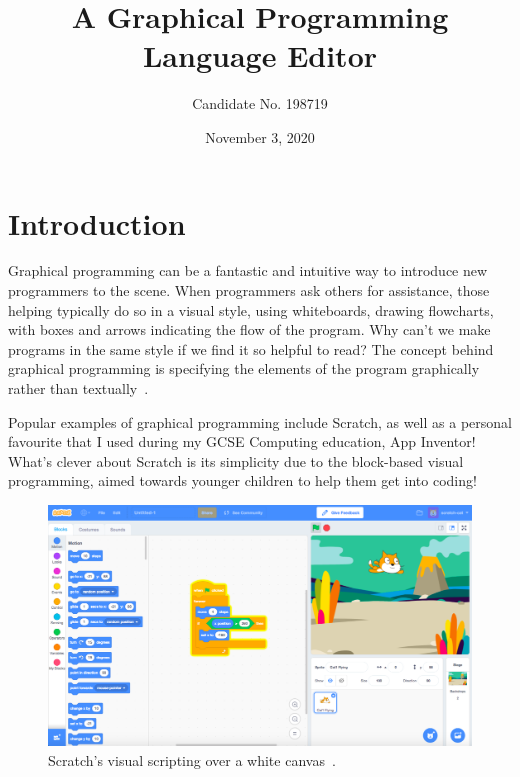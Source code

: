 \documentclass[a4paper, 12pt]{article}
\begin{document}
    \title{A Graphical Programming Language Editor}
    \author{Candidate No. 198719}
    \date{November 3, 2020}
    \clearpage\maketitle
    \thispagestyle{empty}

    \newpage\clearpage\thispagestyle{empty}
    \tableofcontents
    \newpage
    \setcounter{page}{1}

    \section{Introduction}
    Graphical programming can be a fantastic and intuitive way to introduce new programmers to
    the scene. When programmers ask others for assistance, those helping typically do so in a visual 
    style, using whiteboards, drawing flowcharts, with boxes and arrows indicating the flow 
    of the program. Why can't we make programs in the same style if we find it so helpful to read? 
    The concept behind graphical programming is specifying the elements of the program graphically 
    rather than textually~\cite{dehouck2015maturity}.

    Popular examples of graphical programming include Scratch, as well as a personal favourite that 
    I used during my GCSE Computing education, App Inventor!
    What's clever about Scratch is its simplicity due to the block-based visual programming, aimed 
    towards younger children to help them get into coding!

    \begin{figure}[h]
        \centering
        \includegraphics[width=160mm]{scratch_image}
        \caption{Scratch's visual scripting over a white canvas~\cite{thescratchteam}.}
    \end{figure}
\end{document}
